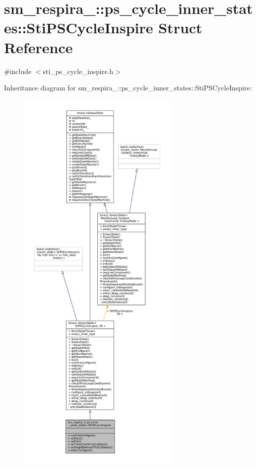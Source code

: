 \hypertarget{structsm__respira__1_1_1ps__cycle__inner__states_1_1StiPSCycleInspire}{}\section{sm\+\_\+respira\+\_\+:\+:ps\+\_\+cycle\+\_\+inner\+\_\+states\+:\+:Sti\+P\+S\+Cycle\+Inspire Struct Reference}
\label{structsm__respira__1_1_1ps__cycle__inner__states_1_1StiPSCycleInspire}


{\ttfamily \#include $<$sti\+\_\+ps\+\_\+cycle\+\_\+inspire.\+h$>$}



Inheritance diagram for sm\+\_\+respira\+\_\+:\+:ps\+\_\+cycle\+\_\+inner\+\_\+states\+:\+:Sti\+P\+S\+Cycle\+Inspire\+:
\nopagebreak
\begin{figure}[H]
\begin{center}
\leavevmode
\includegraphics[height=550pt]{structsm__respira__1_1_1ps__cycle__inner__states_1_1StiPSCycleInspire__inherit__graph}
\end{center}
\end{figure}


